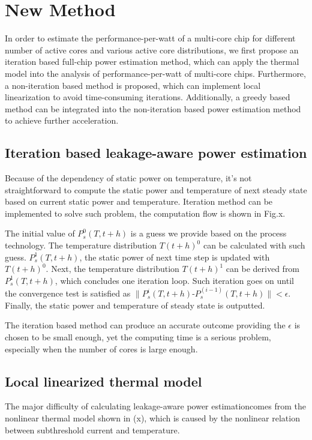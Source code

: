 \section{New Method}
In order to estimate the performance-per-watt of a multi-core chip for different number of 
active cores and various active core distributions, we first propose an iteration based 
full-chip power estimation method, which can apply the thermal model into the analysis of
performance-per-watt of multi-core chips. Furthermore, a non-iteration based method is 
proposed, which can implement local linearization to avoid time-consuming iterations. 
Additionally, a greedy based method can be integrated into the non-iteration based power
estimation method to achieve further acceleration.

\subsection{Iteration based leakage-aware power estimation}
Because of the dependency of static power on temperature, it's not straightforward to compute
the static power and temperature of next steady state based on current static power and 
temperature. Iteration method can be implemented to solve such problem, the computation flow 
is shown in Fig.x.

The initial value of $P^0_s(T,t+h)$ is a guess we provide based on the process technology.
The temperature distribution $T(t+h)^0$ can be calculated with such guess. $P^1_s(T,t+h)$,
the static power of next time step is updated with $T(t+h)^0$. Next, the temperature 
distribution $T(t+h)^1$ can be derived from $P^1_s(T,t+h)$, which concludes one iteration
loop. Such iteration goes on until the convergence test is satisfied as 
$\parallel P^i_s(T,t+h)$-$P^(i-1)_s(T,t+h)\parallel<\epsilon$. Finally, the static power and
temperature of steady state is outputted.

The iteration based method can produce an accurate outcome providing the $\epsilon$ is 
chosen to be small enough, yet the computing time is a serious problem, especially when the
number of cores is large enough.

\subsection{Local linearized thermal model}
The major difficulty of calculating leakage-aware power estimationcomes from the nonlinear 
thermal model shown in (x), which is caused by the nonlinear relation between subthreshold 
current and temperature.


